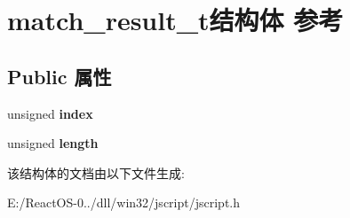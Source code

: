 \hypertarget{structmatch__result__t}{}\section{match\+\_\+result\+\_\+t结构体 参考}
\label{structmatch__result__t}
\subsection*{Public 属性}
\begin{DoxyCompactItemize}
\item 
\mbox{\label{structmatch__result__t_a7d4a3eafaeaadceace1c849185af4a4c}} 
unsigned {\bfseries index}
\item 
\mbox{\label{structmatch__result__t_ac323303b8a70cf84dae10e75728e4bf4}} 
unsigned {\bfseries length}
\end{DoxyCompactItemize}


该结构体的文档由以下文件生成\+:\begin{DoxyCompactItemize}
\item 
E\+:/\+React\+O\+S-\/0../dll/win32/jscript/jscript.\+h\end{DoxyCompactItemize}
